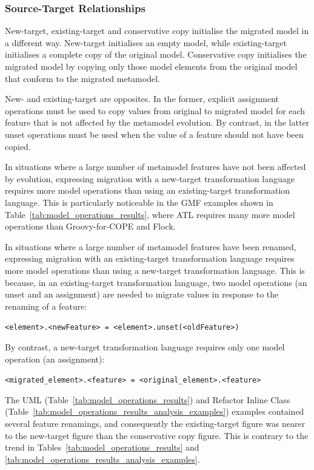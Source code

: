 \subsubsection{Source-Target Relationships}
New-target, existing-target and conservative copy initialise the migrated model in a different way. New-target initialises an empty model, while existing-target initialises a complete copy of the original model. Conservative copy initialises the migrated model by copying only those model elements from the original model that conform to the migrated metamodel.

New- and existing-target are opposites. In the former, explicit assignment operations must be used to copy values from original to migrated model for each feature that is not affected by the metamodel evolution. By contrast, in the latter unset operations must be used when the value of a feature should not have been copied.

In situations where a large number of metamodel features have not been affected by evolution, expressing migration with a new-target transformation language requires more model operations than using an existing-target transformation language. This is particularly noticeable in the GMF examples shown in Table~\ref{tab:model_operations_results}, where ATL requires many more model operations than Groovy-for-COPE and Flock.

In situations where a large number of metamodel features have been renamed, expressing migration with an existing-target transformation language requires more model operations than using a new-target transformation language. This is because, in an existing-target transformation language, two model operations (an unset and an assignment) are needed to migrate values in response to the renaming of a feature:

\texttt{<element>.<newFeature> = <element>.unset(<oldFeature>)}

By contrast, a new-target transformation language requires only one model operation (an assignment):

\texttt{<migrated\_element>.<feature> = <original\_element>.<feature>}

The UML (Table~\ref{tab:model_operations_results}) and Refactor Inline Class (Table~\ref{tab:model_operations_results_analysis_examples}) examples contained several feature renamings, and consequently the existing-target figure was nearer to the new-target figure than the conservative copy figure. This is contrary to the trend in Tables~\ref{tab:model_operations_results} and \ref{tab:model_operations_results_analysis_examples}.

